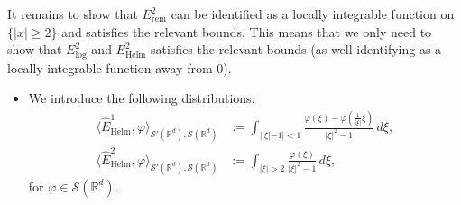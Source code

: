 \documentclass[11pt]{amsart}
\newcommand{\R}{\mathbb{R}}
\begin{document}
It remains to show that $E_{\text{rem}}^{2}$ can be identified as a locally integrable function on $\{|x|\geq 2\}$ and satisfies the relevant bounds. This means that we only need to show that $E_{\log}^{2}$ and $E_{\text{Helm}}^{2}$ satisfies the relevant bounds (as well identifying as a locally integrable function away from $0$). 
\begin{itemize}
\item[Step 1.]
We introduce the following distributions:
\begin{equation*}
        \begin{split}
            \langle \hat{E}_{\text{Helm}}^{1},\varphi \rangle_{\mathcal{S}'(\R^d),\mathcal{S}(\R^d)}&:=\int_{||\xi|-1|<1}\frac{\varphi(\xi)-\varphi(\frac{1}{|\xi|}\xi)}{|\xi|^2-1}\,d\xi,\\
            \langle \hat{E}_{\text{Helm}}^{2},\varphi \rangle_{\mathcal{S}'(\R^d),\mathcal{S}(\R^d)}&:=\int_{|\xi|>2}\frac{\varphi(\xi)}{|\xi|^2-1}\,d\xi,
        \end{split}
\end{equation*}
    for $\varphi \in \mathcal{S}(\R^d)$. 


\end{itemize}
\end{document}
